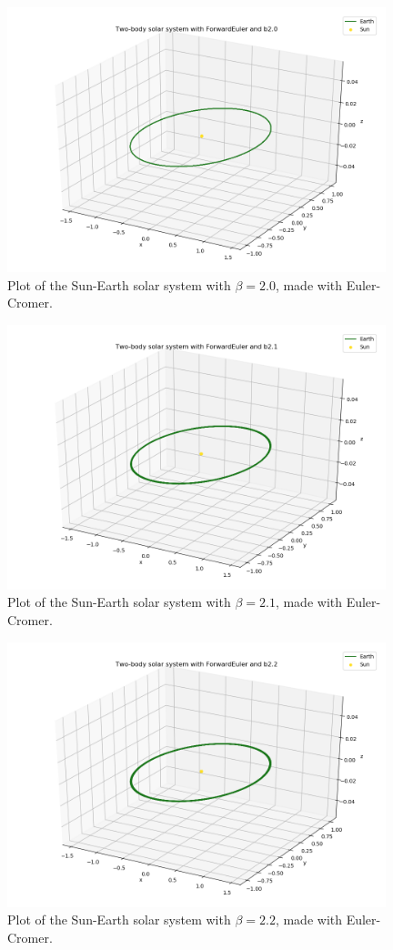 \documentclass{article}
\begin{document}
    \begin{figure}[H]
        \centering
        \includegraphics[width = 11cm]{img/plot3D_S_E_F_b20.png}
        \caption{Plot of the Sun-Earth solar system with $\beta = 2.0$, made with Euler-Cromer. }
        \label{fig:plot3D_S_E_F_b20}
    \end{figure}

    \begin{figure}[H]
        \centering
        \includegraphics[width = 11cm]{img/plot3D_S_E_F_b21.png}
        \caption{Plot of the Sun-Earth solar system with $\beta = 2.1$, made with Euler-Cromer.}
        \label{fig:plot3D_S_E_F_b21}
    \end{figure}

    \begin{figure}[H]
        \centering
        \includegraphics[width = 11cm]{img/plot3D_S_E_F_b22.png}
        \caption{Plot of the Sun-Earth solar system with $\beta = 2.2$, made with Euler-Cromer.}
        \label{fig:plot3D_S_E_F_b22}
    \end{figure}
\end{document}
